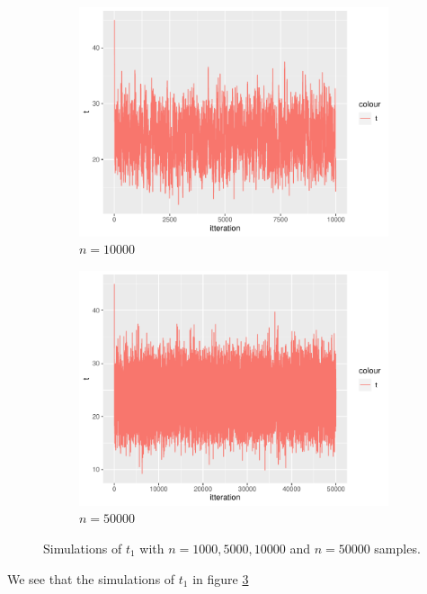 \begin{figure}[h]
\begin{subfigure}[b]{0.49\textwidth}
        \includegraphics[width = \textwidth]{Images/sim_t.pdf}
        \caption{$n = 10000$ }
        \label{fig:}
    \end{subfigure}
    \begin{subfigure}[b]{0.49\textwidth}
        \centering
        \includegraphics[width = \textwidth]{Images/sim_t_50000.pdf}
        \caption{$n =  50000$}
        \label{fig:}
    \end{subfigure}
    \caption{Simulations of $t_1$ with $n = 1000, 5000, 10000$ and $n=50000$ samples. }
    \label{fig:sim_t_big_n}
\end{figure}

We see that the simulations of $t_1$ in figure \ref{fig:sim_t_big_n} 

